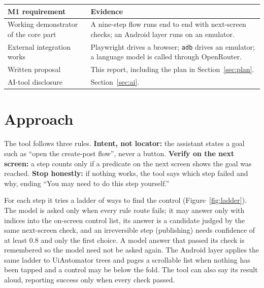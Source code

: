 \documentclass[11pt,a4paper]{article}
\begin{document}
\begin{table}[H]\centering\small
\begin{tabular}{p{5.2cm}p{8.6cm}}\toprule
M1 requirement & Evidence \\ \midrule
Working demonstrator of the core part & A nine-step flow runs end to end with next-screen checks; an Android layer runs on an emulator. \\
External integration works & Playwright drives a browser; \texttt{adb} drives an emulator; a language model is called through OpenRouter. \\
Written proposal & This report, including the plan in Section~\ref{sec:plan}. \\
AI-tool disclosure & Section~\ref{sec:ai}. \\ \bottomrule
\end{tabular}
\end{table}

\section{Approach}\label{sec:approach}
The tool follows three rules. \textbf{Intent, not locator:} the assistant states a goal such as ``open the create-post flow'', never a button. \textbf{Verify on the next screen:} a step counts only if a predicate on the next screen shows the goal was reached. \textbf{Stop honestly:} if nothing works, the tool says which step failed and why, ending ``You may need to do this step yourself.''

\FigFlow

For each step it tries a ladder of ways to find the control (Figure~\ref{fig:ladder}). The model is asked only when every rule route fails; it may answer only with indices into the on-screen control list, its answer is a candidate judged by the same next-screen check, and an irreversible step (publishing) needs confidence of at least 0.8 and only the first choice. A model answer that passed its check is remembered so the model need not be asked again. The Android layer applies the same ladder to UiAutomator trees and pages a scrollable list when nothing has been tapped and a control may be below the fold. The tool can also say its result aloud, reporting success only when every check passed.

\FigLadder
\end{document}
